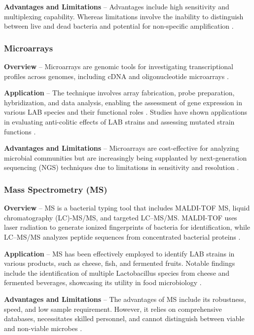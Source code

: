 \textbf{Advantages and Limitations} – Advantages include high sensitivity and multiplexing capability. Whereas limitations involve the inability to distinguish between live and dead bacteria and potential for non-specific amplification \cite*{L4-MolTyping}.

\subsubsection{Microarrays}
\textbf{Overview} – Microarrays are genomic tools for investigating transcriptional profiles across genomes, including cDNA and oligonucleotide microarrays \cite*{L4-MolTyping}.

\textbf{Application} – The technique involves array fabrication, probe preparation, hybridization, and data analysis, enabling the assessment of gene expression in various LAB species and their functional roles \cite*{L4-MolTyping}. Studies have shown applications in evaluating anti-colitic effects of LAB strains and assessing mutated strain functions \cite*{L4-MolTyping}.

\textbf{Advantages and Limitations} – Microarrays are cost-effective for analyzing microbial communities but are increasingly being supplanted by next-generation sequencing (NGS) techniques due to limitations in sensitivity and resolution \cite*{L4-MolTyping}.

\subsubsection*{Mass Spectrometry (MS)}
\textbf{Overview} – MS is a bacterial typing tool that includes MALDI-TOF MS, liquid chromatography (LC)-MS/MS, and targeted LC–MS/MS. MALDI-TOF uses laser radiation to generate ionized fingerprints of bacteria for identification, while LC–MS/MS analyzes peptide sequences from concentrated bacterial proteins \cite*{L4-MolTyping}.

\textbf{Application} – MS has been effectively employed to identify LAB strains in various products, such as cheese, fish, and fermented fruits. Notable findings include the identification of multiple Lactobacillus species from cheese and fermented beverages, showcasing its utility in food microbiology \cite*{L4-MolTyping}.

\textbf{Advantages and Limitations} – The advantages of MS include its robustness, speed, and low sample requirement. However, it relies on comprehensive databases, necessitates skilled personnel, and cannot distinguish between viable and non-viable microbes \cite*{L4-MolTyping}.

